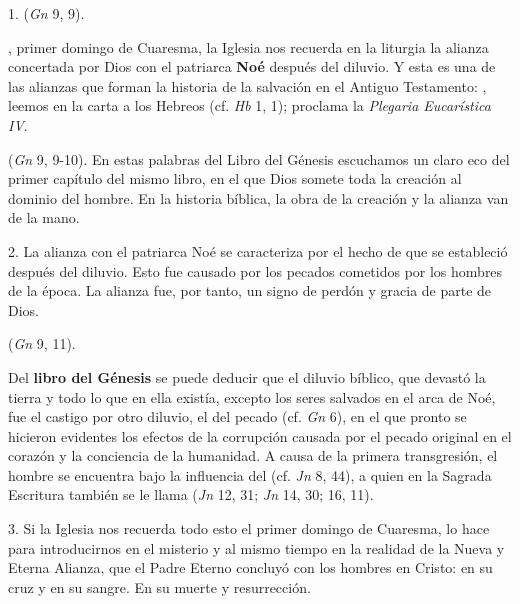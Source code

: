 \begin{body}
1.  (\textit{Gn} 9, 9).

, primer domingo de Cuaresma, la Iglesia nos recuerda en la liturgia la alianza concertada por Dios con el patriarca \textbf{Noé} después del diluvio. Y esta es una de las alianzas que forman la historia de la salvación en el Antiguo Testamento: , leemos en la carta a los Hebreos (cf. \textit{Hb} 1, 1);  proclama la \textit{Plegaria Eucarística IV}.

 (\textit{Gn} 9, 9-10). En estas palabras del Libro del Génesis escuchamos un claro eco del primer capítulo del mismo libro, en el que Dios somete toda la creación al dominio del hombre. En la historia bíblica, la obra de la creación y la alianza van de la mano.

2. La alianza con el patriarca Noé se caracteriza por el hecho de que se estableció después del diluvio. Esto fue causado por los pecados cometidos por los hombres de la época. La alianza fue, por tanto, un signo de perdón y gracia de parte de Dios.

 (\textit{Gn} 9, 11).

Del \textbf{libro del Génesis} se puede deducir que el diluvio bíblico, que devastó la tierra y todo lo que en ella existía, excepto los seres salvados en el arca de Noé, fue el castigo por otro diluvio, el del pecado (cf. \textit{Gn} 6), en el que pronto se hicieron evidentes los efectos de la corrupción causada por el pecado original en el corazón y la conciencia de la humanidad. A causa de la primera transgresión, el hombre se encuentra bajo la influencia del  (cf. \textit{Jn} 8, 44), a quien en la Sagrada Escritura también se le llama  (\textit{Jn} 12, 31; \textit{Jn} 14, 30; 16, 11).

3. Si la Iglesia nos recuerda todo esto el primer domingo de Cuaresma, lo hace para introducirnos en el misterio y al mismo tiempo en la realidad de la Nueva y Eterna Alianza, que el Padre Eterno concluyó con los hombres en Cristo: en su cruz y en su sangre. En su muerte y resurrección.


\end{body}
